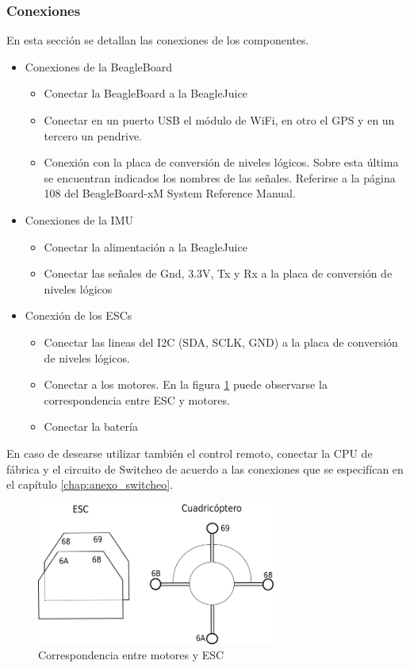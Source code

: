\documentclass[main]{subfiles}
\begin{document}
\subsubsection{Conexiones}
En esta secci\'on se detallan las conexiones de los componentes.
\begin{itemize}
\item Conexiones de la BeagleBoard
	\begin{itemize}
	\item Conectar la BeagleBoard a la BeagleJuice
	\item Conectar en un puerto USB el módulo de WiFi, en otro el GPS y en un tercero un pendrive.
	\item Conexión con la placa de conversión de niveles lógicos. Sobre esta \'ultima se encuentran indicados los nombres de las señales. Referirse a la p\'agina 108 del BeagleBoard-xM System Reference Manual.
	\end{itemize}
\item Conexiones de la IMU
	\begin{itemize}
	\item Conectar la alimentaci\'on a la BeagleJuice
	\item Conectar las señales de Gnd, 3.3V, Tx y Rx a la placa de conversión de niveles l\'ogicos
	\end{itemize}
\item Conexión de los ESCs
	\begin{itemize}
	\item Conectar las lineas del I2C (SDA, SCLK, GND) a la placa de conversión de niveles l\'ogicos.
	\item Conectar a los motores. En la figura \ref{fig:conexion_motores} puede observarse la correspondencia entre ESC y motores.
	\item Conectar la bater\'ia
	\end{itemize}
\end{itemize}

En caso de desearse utilizar también el control remoto, conectar la CPU de f\'abrica y el circuito de Switcheo de acuerdo a las conexiones que se especif\'ican en el cap\'itulo \ref{chap:anexo_switcheo}.

\begin{figure}
	\centering
	\includegraphics[width=0.7\textwidth]{./pics_manual/diagrama.png}
	\caption{Correspondencia entre motores y ESC}
	\label{fig:conexion_motores}
\end{figure}
\end{document}
